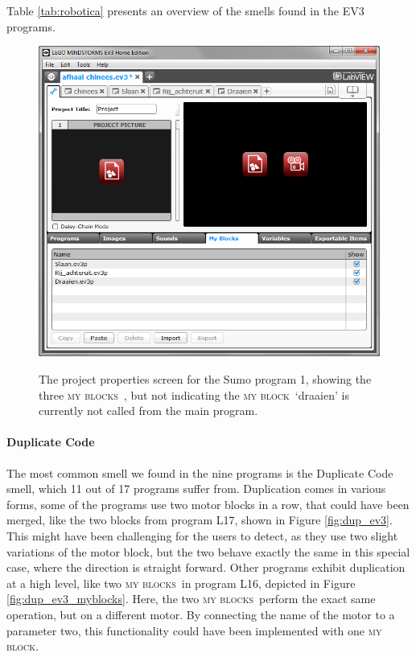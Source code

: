\documentclass{sig-alternate}
\newcommand{\mbs}{\textsc{my blocks}}
\newcommand{\mb}{\textsc{my block}}
\begin{document}
Table \ref{tab:robotica} presents an overview of the smells found in the EV3 programs.


\begin{figure} [ht]
\caption{The project properties screen for the Sumo program 1, showing the three \mbs~, but not indicating the \mb~`draaien' is currently not called from the main program.}
\centering
\includegraphics[width=\columnwidth]{img/overview}
\label{fig:overview}
\end{figure}

\paragraph{Duplicate Code}
The most common smell we found in the nine programs is the Duplicate Code smell, which 11 out of 17 programs suffer from. Duplication comes in various forms, some of the programs use two motor blocks in a row, that could have been merged, like the two blocks from program L17, shown in Figure \ref{fig:dup_ev3}. This might have been challenging for the users to detect, as they use two slight variations of the motor block, but the two behave exactly the same in this special case, where the direction is straight forward. Other programs exhibit duplication at a high level, like two \mbs~in program L16, depicted in Figure \ref{fig:dup_ev3_myblocks}. Here, the two \mbs~perform the exact same operation, but on a different motor. By connecting the name of the motor to a parameter two, this functionality could have been implemented with one \mb.
\end{document}
